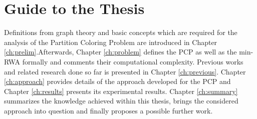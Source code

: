 \section{Guide to the Thesis}

Definitions from graph theory and basic concepts which are required for the analysis of the Partition Coloring Problem are introduced in Chapter \ref{ch:prelim}.Afterwards, Chapter \ref{ch:problem} defines the PCP as well as the min-RWA formally and comments their computational complexity. Previous works and related research done so far is presented in Chapter \ref{ch:previous}. Chapter \ref{ch:approach} provides details of the approach developed for the PCP and Chapter \ref{ch:results} presents its experimental results. Chapter \ref{ch:summary} summarizes the knowledge achieved within this thesis, brings the considered approach into question and finally proposes a possible further work.